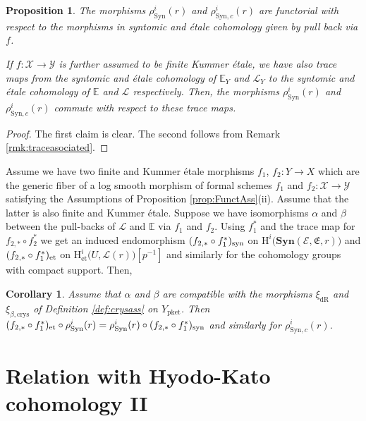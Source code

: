 \documentclass[asterisque,english]{smfart}
\newtheorem{cor}[theo]{Corollary}
\newtheorem{proposition}[theo]{Proposition}
\begin{document}
\begin{proposition} The  morphisms $\rho_{\mathrm{Syn}}^i(r)$ and $\rho_{\mathrm{Syn},c}^i(r)$ are functorial with respect to the morphisms in syntomic and \'etale cohomology given by pull back via $f$.

If $f\colon \mathcal{X}\to \mathcal{Y}$ is further assumed to be finite Kummer \'etale, we have also trace maps from the syntomic and \'etale cohomology of $\mathbb{E}_Y$ and $\mathcal{L}_Y$  to the syntomic and \'etale cohomology of $\mathbb{E}$ and $\mathcal{L}$ respectively. Then, the  morphisms $\rho_{\mathrm{Syn}}^i(r)$ and $\rho_{\mathrm{Syn},c}^i(r)$ commute with respect to these trace maps. 

\end{proposition}
\begin{proof}
The first claim is clear. The second follows from Remark \ref{rmk:traceasociated}.
\end{proof}

Assume we have two finite and Kummer \'etale morphisms $f_1$, $f_2\colon Y\to X$ which are the generic fiber of a  log smooth morphism of formal schemes $f_1$ and $f_2\colon \mathcal{X}\to \mathcal{Y}$ satisfying the Assumptions of  Proposition \ref{prop:FunctAss}(ii). Assume that the latter is also finite and Kummer \'etale. Suppose we have isomorphisms $\alpha$ and $\beta$  between the pull-backs of $\mathcal{L}$ and $\mathbb{E}$ via $f_1$ and $f_2$. Using $f_1^\ast$ and the trace map for $f_{2,\ast} \circ f_2^\ast$  we get an induced endomorphism  $(f_{2,\ast} \circ f_1^\ast)_{\rm syn}$ on $\mathrm{H}^i\bigl(\mathbf{Syn}(\mathcal{E},\mathfrak{E},r)\bigr)$ and $(f_{2,\ast} \circ f_1^\ast)_{\rm et}$ on $\mathrm{H}^i_{\mathrm{et}}\bigl(U, \mathcal{L}(r)\bigr)[p^{-1}]$ and similarly for the cohomology groups with compact support. Then,

\begin{cor}\label{cor:Heckeop} Assume that $\alpha$ and $\beta$ are compatible with the morphisms $\xi_{\mathrm{dR}}$ and $\xi_{\beta,\mathrm{crys}}$ of Definition \ref{def:crysass} on $Y_{\mathrm{pket}}$. Then  $(f_{2,\ast} \circ f_1^\ast)_{\rm et}\circ  \rho_{\mathrm{Syn}}^i(r)= \rho_{\mathrm{Syn}}^i(r)  \circ  (f_{2,\ast} \circ f_1^\ast)_{\rm syn}$ and similarly for $\rho_{\mathrm{Syn},c}^i(r)$.
\end{cor}

\section{Relation with Hyodo-Kato cohomology II}\label{sec:HKII}
\end{document}
